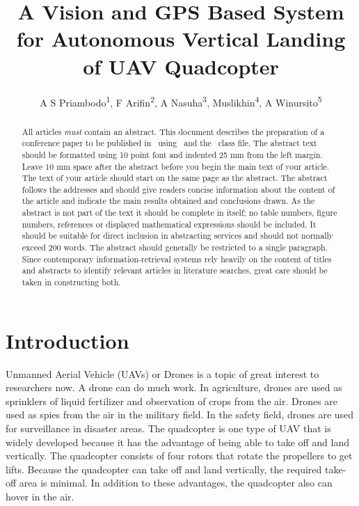 \documentclass[a4paper]{jpconf}
\begin{document}
\title{A Vision and GPS Based System for Autonomous Vertical Landing of UAV Quadcopter}

\author{A S Priambodo\textsuperscript{1}, F Arifin\textsuperscript{2}, A Nasuha\textsuperscript{3}, Muslikhin\textsuperscript{4}, A Winursito\textsuperscript{5}}

\address{\textsuperscript{1,2,3,4,5}Department of Electronics and Informatics Engineering of Education, Engineering Faculty, Universitas Negeri Yogyakarta, Indonesia}


\begin{abstract}
    All articles {\it must} contain an abstract. This document describes the  preparation of a conference paper to be published in \jpcs\ using \LaTeXe\ and the \cls\ class file. The abstract text should be formatted using 10 point font and indented 25 mm from the left margin. Leave 10 mm space after the abstract before you begin the main text of your article. The text of your article should start on the same page as the abstract. The abstract follows the addresses and should give readers concise information about the content of the article and indicate the main results obtained and conclusions drawn. As the abstract is not part of the text it should be complete in itself; no table numbers, figure numbers, references or displayed mathematical expressions should be included. It should be suitable for direct inclusion in abstracting services and should not normally exceed 200 words. The abstract should generally be restricted to a single paragraph. Since contemporary information-retrieval systems rely heavily on the content of titles and abstracts to identify relevant articles in literature searches, great care should be taken in constructing both.
\end{abstract}

\section{Introduction}
Unmanned Aerial Vehicle (UAVs) or Drones is a topic of great interest to researchers now. A drone can do much work. In agriculture, drones are used as sprinklers of liquid fertilizer and observation of crops from the air\cite{ref1}. Drones are used as spies from the air in the military field\cite{ref2}. In the safety field, drones are used for surveillance in disaster areas\cite{ref3}. The quadcopter is one type of UAV that is widely developed because it has the advantage of being able to take off and land vertically. The quadcopter consists of four rotors that rotate the propellers to get lifts. Because the quadcopter can take off and land vertically, the required take-off area is minimal. In addition to these advantages, the quadcopter also can hover in the air.
\end{document}

